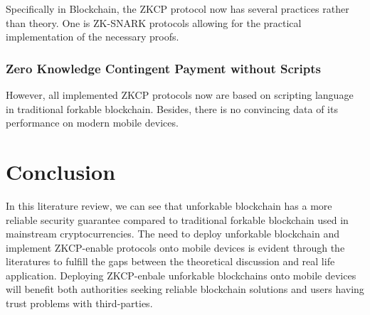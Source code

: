 \documentclass[12pt]{article}
\begin{document}
Specifically in Blockchain, the ZKCP protocol now has several practices rather than theory. One is ZK-SNARK protocols allowing for the practical implementation of the necessary proofs\cite{kalai2006succinct}\cite{ben2015secure}\cite{ecc2011}.

\subsubsection{Zero Knowledge Contingent Payment without Scripts}

However, all implemented ZKCP protocols now are based on scripting language in traditional forkable blockchain\cite{Banasik2016}. Besides, there is no convincing data of its performance on modern mobile devices\cite{doi:10.1080/00207160.2014.933816}.

\section{Conclusion}

In this literature review, we can see that unforkable blockchain has a more reliable security guarantee compared to traditional forkable blockchain used in mainstream cryptocurrencies. The need to deploy unforkable blockchain and implement ZKCP-enable protocols onto mobile devices is evident through the literatures to fulfill the gaps between the theoretical discussion and real life application. Deploying ZKCP-enbale unforkable blockchains onto mobile devices will benefit both authorities seeking reliable blockchain solutions and users having trust problems with third-parties.

\newpage


\end{document}
